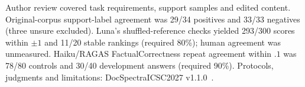 \label{sec:review-appendix}
Author review covered task requirements, support samples and edited content.
Original-corpus support-label agreement was 29/34 positives and 33/33 negatives
(three unsure excluded). Luna's shuffled-reference checks yielded 293/300
scores within $\pm1$ and 11/20 stable rankings (required 80\%); human agreement
was unmeasured. Haiku/RAGAS FactualCorrectness repeat agreement within $.1$ was
78/80 controls and 30/40 development answers (required 90\%). Protocols,
judgments and limitations: DocSpectraICSC2027 v1.1.0~\cite{docspectraicsc2027}.
